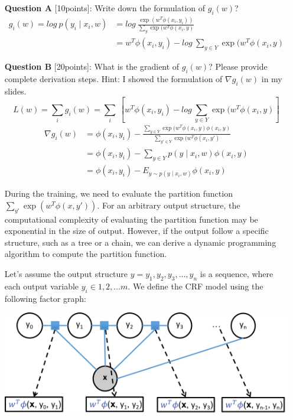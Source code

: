 \begin{itemize}
\item[{\bf Question A}][10points]:  Write down the formulation of $g_i(w)$?
{\color{blue}
\begin{equation*}
\begin{split}
g_i(w) = log \ p(y_i\mid x_i, w) & = log \ \frac{\exp(w^T\phi(x_i,y_i))}{\sum_{y} \exp(w^T\phi(x_i,y)} \\
& = w^T\phi(x_i,y_i) - log \ {\sum_{y \in Y} \exp(w^T\phi(x_i,y)}
\end{split}
\end{equation*}
}

\item[ {\bf Question B}][20points]: What is the gradient of  $g_i(w)$? Please provide complete derivation steps. Hint: I showed the formulation of $\nabla g_i(w)$ in my slides.
{\color{blue}
\begin{equation*}
L(w) = \sum_{i} g_i(w) = \sum_{i} \ [w^T\phi(x_i,y_i) -  log \ {\sum_{y \in Y} \exp(w^T\phi(x_i,y)}]
\end{equation*}
\begin{equation*}
\begin{split}
\nabla g_i(w) & = \phi(x_i,y_i) - \frac{\sum_{y \in Y} \exp(w^T\phi(x_i,y)
\phi(x_i,y)}{\sum_{y' \in Y} \exp(w^T\phi(x_i,y')} \\
& = \phi(x_i,y_i) - \sum_{y \in Y} p(y \mid x_i, w) \phi(x_i,y) \\
& = \phi(x_i,y_i) - E_{y\sim p(y \mid x_i, w)} \phi(x_i,y)
\end{split}
\end{equation*}
}

During the training, we need to evaluate the partition function $\sum_{y'} \exp(w^T\phi(x,y'))$. For an arbitrary output structure, the computational complexity of evaluating the partition function may be exponential in the size of output. However, if the output follow a specific structure, such as a tree or a chain, we can derive a dynamic programming algorithm to compute the partition function.  

Let's assume the output structure 
$y=y_1, y_2, y_3, \ldots, y_n$ is a sequence, where each output variable $y_i\in {1,2,\ldots m}$.
We define the CRF model using the following factor graph:

\includegraphics[width=0.8\linewidth]{factor}


\end{itemize}
